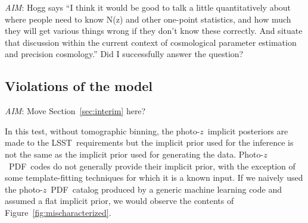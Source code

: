 \documentclass[iop]{emulateapj}
\newcommand{\todo}[3]{{\color{#2}\emph{#1}: #3}}
\newcommand{\aim}[1]{\todo{AIM}{red}{#1}}
\newcommand{\Sect}[1]{Section~\ref{#1}}
\newcommand{\Fig}[1]{Figure~\ref{#1}}
\newcommand{\project}[1]{{\textsc{#1}}}
\newcommand{\lsst}{\project{LSST}}
\newcommand{\pz}{photo-$z$~}
\newcommand{\Pz}{Photo-$z$~}
\newcommand{\pzpdf}{\pz PDF}
\newcommand{\Pzpdf}{\Pz PDF}
\newcommand{\pzip}{\pz implicit posterior}
\begin{document}
\aim{Hogg says ``I think it would be good to talk a little quantitatively about where people need to know N(z) and other one-point statistics, and how much they will get various things wrong if they don't know these correctly. 
	And situate that discussion within the current context of cosmological parameter estimation and precision cosmology.''
	Did I successfully answer the question?}

\subsection{Violations of the model}
\label{sec:violations}

\aim{Move \Sect{sec:interim} here?}

In this test, without tomographic binning, the \pzip s are made to the \lsst\ requirements but the implicit prior used for the inference is not the same as the implicit prior used for generating the data.
\Pzpdf\ codes do not generally provide their implicit prior, with the exception of some template-fitting techniques for which it is a known input.
If we naively used the \pzpdf\ catalog produced by a generic machine learning code and assumed a flat implicit prior, we would observe the contents of \Fig{fig:mischaracterized}.
\end{document}
